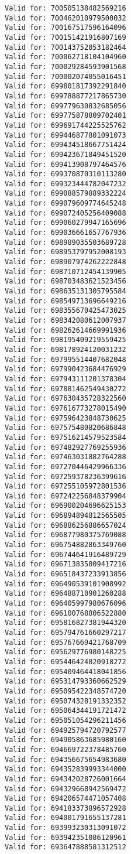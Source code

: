 \documentclass[11pt]{article}
\begin{document}
\begin{Verbatim}[commandchars=\\\{\}]
Valid for: 700505138482569216
Valid for: 700462010979500032
Valid for: 700167517596164096
Valid for: 700151421916807169
Valid for: 700143752053182464
Valid for: 700062718104104960
Valid for: 700029284593901568
Valid for: 700002074055016451
Valid for: 699801817392291840
Valid for: 699788877217865730
Valid for: 699779630832685056
Valid for: 699775878809702401
Valid for: 699691744225525762
Valid for: 699446877801091073
Valid for: 699434518667751424
Valid for: 699423671849451520
Valid for: 699413908797464576
Valid for: 699370870310113280
Valid for: 699323444782047232
Valid for: 699088579889332224
Valid for: 699079609774645248
Valid for: 699072405256409088
Valid for: 699060279947165696
Valid for: 699036661657767936
Valid for: 698989035503689728
Valid for: 698953797952008193
Valid for: 698907974262222848
Valid for: 698710712454139905
Valid for: 698703483621523456
Valid for: 698635131305795584
Valid for: 698549713696649216
Valid for: 698355670425473025
Valid for: 698342080612007937
Valid for: 698262614669991936
Valid for: 698195409219559425
Valid for: 698178924120031232
Valid for: 697995514407682048
Valid for: 697990423684476929
Valid for: 697943111201378304
Valid for: 697881462549430272
Valid for: 697630435728322560
Valid for: 697616773278015490
Valid for: 697596423848730625
Valid for: 697575480820686848
Valid for: 697516214579523584
Valid for: 697482927769255936
Valid for: 697463031882764288
Valid for: 697270446429966336
Valid for: 697259378236399616
Valid for: 697255105972801536
Valid for: 697242256848379904
Valid for: 696900204696625153
Valid for: 696894894812565505
Valid for: 696886256886657024
Valid for: 696877980375769088
Valid for: 696754882863349760
Valid for: 696744641916489729
Valid for: 696713835009417216
Valid for: 696518437233913856
Valid for: 696490539101908992
Valid for: 696488710901260288
Valid for: 696405997980676096
Valid for: 696100768806522880
Valid for: 695816827381944320
Valid for: 695794761660297217
Valid for: 695767669421768709
Valid for: 695629776980148225
Valid for: 695446424020918272
Valid for: 695409464418041856
Valid for: 695314793360662529
Valid for: 695095422348574720
Valid for: 695074328191332352
Valid for: 695064344191721472
Valid for: 695051054296211456
Valid for: 694925794720792577
Valid for: 694905863685980160
Valid for: 694669722378485760
Valid for: 694356675654983680
Valid for: 694352839993344000
Valid for: 694342028726001664
Valid for: 694329668942569472
Valid for: 694206574471057408
Valid for: 694183373896572928
Valid for: 694001791655137281
Valid for: 693993230313091072
Valid for: 693942351086120961
Valid for: 693647888581312512

\end{Verbatim}
\end{document}
